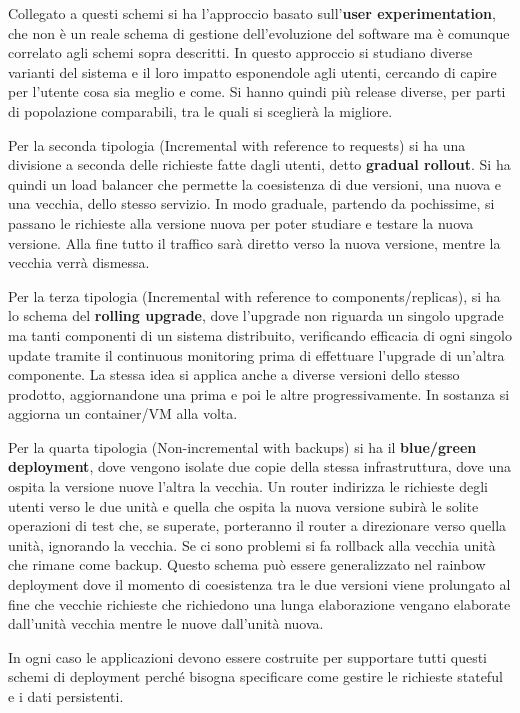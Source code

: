 Collegato a questi schemi si ha l'approccio basato sull'\textbf{user experimentation},
che non è un reale schema di gestione dell'evoluzione del software ma è comunque
correlato agli schemi sopra descritti. In questo approccio si studiano diverse
varianti del sistema e il loro impatto esponendole agli utenti, cercando di capire
per l'utente cosa sia meglio e come. Si hanno quindi più release diverse, per
parti di popolazione comparabili, tra le quali si sceglierà la migliore.

Per la seconda tipologia (Incremental with reference to requests) si ha una
divisione a seconda delle richieste fatte dagli utenti, detto \textbf{gradual
      rollout}. Si ha quindi un load balancer che permette la coesistenza di due
versioni, una nuova e una vecchia, dello stesso servizio. In modo graduale,
partendo da pochissime, si passano le richieste alla versione nuova per poter
studiare e testare la nuova versione. Alla fine tutto il traffico sarà diretto
verso la nuova versione, mentre la vecchia verrà dismessa.

Per la terza tipologia (Incremental with reference to components/replicas),
si ha lo schema del \textbf{rolling upgrade}, dove l'upgrade non riguarda un
singolo upgrade ma tanti componenti di un sistema distribuito, verificando efficacia
di ogni singolo update tramite il continuous monitoring prima di effettuare l'upgrade
di un'altra componente. La stessa idea si applica anche a diverse versioni dello
stesso prodotto, aggiornandone una prima e poi le altre progressivamente. In
sostanza si aggiorna un container/VM alla volta.

Per la quarta tipologia (Non-incremental with backups) si ha il
\textbf{blue/green deployment}, dove vengono isolate due copie della stessa
infrastruttura, dove una ospita la versione nuove l'altra la vecchia. Un router
indirizza le richieste degli utenti verso le due unità e quella che ospita la
nuova versione subirà le solite operazioni di test che, se superate, porteranno
il router a direzionare verso quella unità, ignorando la vecchia. Se ci sono problemi
si fa rollback alla vecchia unità che rimane come backup. Questo schema può essere
generalizzato nel rainbow deployment dove il momento di coesistenza tra le due
versioni viene prolungato al fine che vecchie richieste che richiedono una lunga
elaborazione vengano elaborate dall'unità vecchia mentre le nuove dall'unità nuova.

In ogni caso le applicazioni devono essere costruite per supportare tutti questi
schemi di deployment perché bisogna specificare come gestire le richieste stateful
e i dati persistenti.
